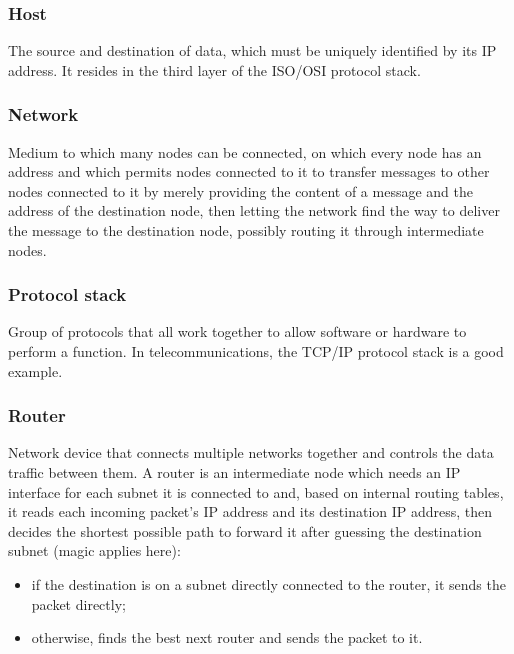 
\subsubsection*{Host}
The source and destination of data, which must be uniquely identified by its IP address. It resides in the third layer of the ISO/OSI protocol stack.


\subsubsection*{Network}
Medium to which many nodes can be connected, on which every node has an address and which permits nodes connected to it to transfer messages to other nodes connected to it by merely providing the content of a message and the address of the destination node, then letting the network find the way to deliver the message to the destination node, possibly routing it through intermediate nodes.


\subsubsection*{Protocol stack}
Group of protocols that all work together to allow software or hardware to perform a function. In telecommunications, the TCP/IP protocol stack is a good example.


\subsubsection*{Router}
Network device that connects multiple networks together and controls the data traffic between them. A router is an intermediate node which needs an IP interface for each subnet it is connected to and, based on internal routing tables, it reads each incoming packet’s IP address and its destination IP address, then decides the shortest possible path to forward it after guessing the destination subnet (magic applies here):

\begin{itemize}
    \item if the destination is on a subnet directly connected to the router, it sends the packet directly;
    \item otherwise, finds the best next router and sends the packet to it.
\end{itemize}

